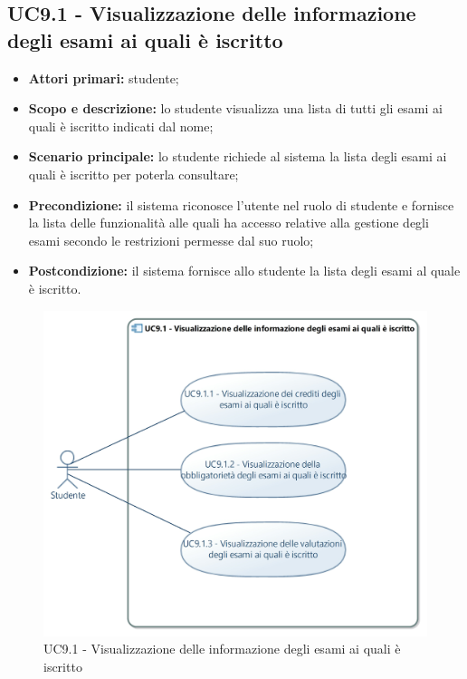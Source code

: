 \documentclass[AnalisiDeiRequisiti.tex]{subfiles}
\begin{document}
\subsection{UC9.1 - Visualizzazione delle informazione degli esami ai quali è iscritto}
\begin{itemize}
	\item \textbf{Attori primari:} studente;
	\item \textbf{Scopo e descrizione:} lo studente visualizza una lista di tutti gli esami ai quali è iscritto indicati dal nome;
	\item \textbf{Scenario principale:} lo studente richiede al sistema la lista degli esami ai quali è iscritto per poterla consultare;
	\item \textbf{Precondizione:} il sistema riconosce l'utente nel ruolo di studente e fornisce la lista delle funzionalità alle quali ha accesso relative alla gestione degli esami secondo le restrizioni permesse dal suo ruolo; 
	\item \textbf{Postcondizione:} il sistema fornisce allo studente la lista degli esami al quale è iscritto.
\end{itemize}

\begin{figure}[H]
	\centering
	\includegraphics[width=1.0\linewidth]{UC9_1.jpg}
	\caption{UC9.1 - Visualizzazione delle informazione degli esami ai quali è iscritto}
	\label{fig:UC9.1 - Visualizzazione delle informazione degli esami ai quali 'e iscritto}
\end{figure}
\end{document}
